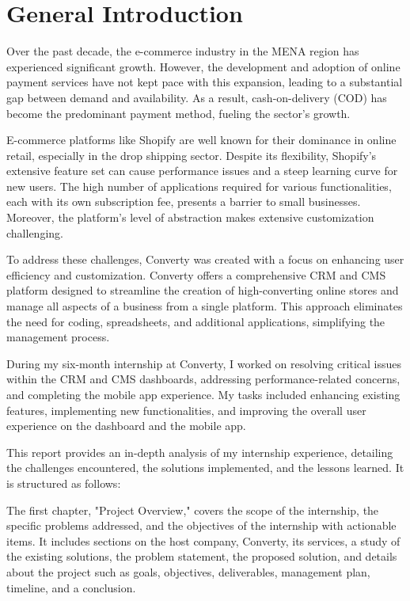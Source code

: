 \chapter*{General Introduction}

Over the past decade, the e-commerce industry in the MENA region has experienced significant growth. However, the development and adoption of online payment services have not kept pace with this expansion, leading to a substantial gap between demand and availability. As a result, cash-on-delivery (COD) has become the predominant payment method, fueling the sector's growth.

E-commerce platforms like Shopify are well known for their dominance in online retail, especially in the drop shipping sector. Despite its flexibility, Shopify’s extensive feature set can cause performance issues and a steep learning curve for new users. The high number of applications required for various functionalities, each with its own subscription fee, presents a barrier to small businesses. Moreover, the platform’s level of abstraction makes extensive customization challenging.

To address these challenges, Converty was created with a focus on enhancing user efficiency and customization. Converty offers a comprehensive CRM and CMS platform designed to streamline the creation of high-converting online stores and manage all aspects of a business from a single platform. This approach eliminates the need for coding, spreadsheets, and additional applications, simplifying the management process.

During my six-month internship at Converty, I worked on resolving critical issues within the CRM and CMS dashboards, addressing performance-related concerns, and completing the mobile app experience. My tasks included enhancing existing features, implementing new functionalities, and improving the overall user experience on the dashboard and the mobile app.

This report provides an in-depth analysis of my internship experience, detailing the challenges encountered, the solutions implemented, and the lessons learned. It is structured as follows:

The first chapter, "Project Overview," covers the scope of the internship, the specific problems addressed, and the objectives of the internship with actionable items. It includes sections on the host company, Converty, its services, a study of the existing solutions, the problem statement, the proposed solution, and details about the project such as goals, objectives, deliverables, management plan, timeline, and a conclusion.

